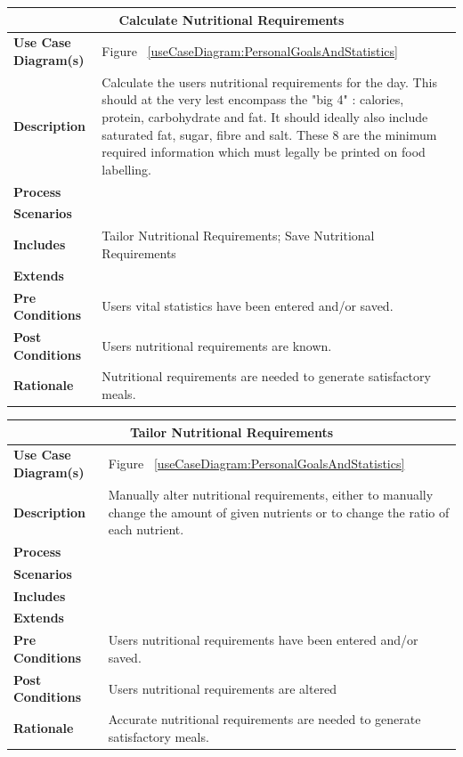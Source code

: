 \documentclass[12pt]{article}
\begin{document}
\begin{center}
\begin{tabularx}{\textwidth}{ |X|X|}
\hline
\multicolumn{2}{|c|}{\textbf{Calculate Nutritional Requirements}}\\
\hline
\hline
\textbf{Use Case Diagram(s)} & Figure ~\ref{useCaseDiagram:PersonalGoalsAndStatistics}\\ \hline
\textbf{Description} & Calculate the users nutritional requirements for the day. This should at the very lest encompass the "big 4" : calories, protein, carbohydrate and fat. It should ideally also include saturated fat, sugar, fibre and salt. These 8 are the minimum required information which must legally be printed on food labelling.\\ \hline
\textbf{Process} & \\ \hline
\textbf{Scenarios} & \\ \hline
\textbf{Includes} & Tailor Nutritional Requirements; Save Nutritional Requirements \\ \hline
\textbf{Extends} &  \\ \hline
\textbf{Pre Conditions} & Users vital statistics have been entered and/or saved.\\ \hline
\textbf{Post Conditions} & Users nutritional requirements are known.\\ \hline
\textbf{Rationale} & Nutritional requirements are needed to generate satisfactory meals.\\ \hline
\end{tabularx}
\end{center}

\begin{center}
\begin{tabularx}{\textwidth}{ |X|X|}
\hline
\multicolumn{2}{|c|}{\textbf{Tailor Nutritional Requirements}}\\
\hline
\hline
\textbf{Use Case Diagram(s)} & Figure ~\ref{useCaseDiagram:PersonalGoalsAndStatistics}\\ \hline
\textbf{Description} & Manually alter nutritional requirements, either to manually change the amount of given nutrients or to change the ratio of each nutrient.\\ \hline
\textbf{Process} & \\ \hline
\textbf{Scenarios} & \\ \hline
\textbf{Includes} & \\ \hline
\textbf{Extends} &  \\ \hline
\textbf{Pre Conditions} & Users  nutritional requirements have been entered and/or saved.\\ \hline
\textbf{Post Conditions} & Users nutritional requirements are altered\\ \hline
\textbf{Rationale} & Accurate nutritional requirements are needed to generate satisfactory meals.\\ \hline
\end{tabularx}
\end{center}
\end{document}
